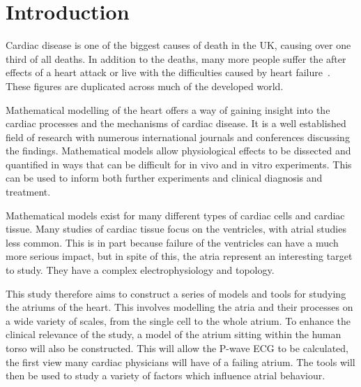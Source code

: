 \chapter{Introduction}

Cardiac disease is one of the biggest causes of death in the UK, causing over
one third of all deaths.
In addition to the deaths, many more people suffer the after effects of a heart
attack or live with the difficulties caused by heart failure~\cite{bhf2008}.
These figures are duplicated across much of the developed world.

Mathematical modelling of the heart offers a way of gaining insight into the
cardiac processes and the mechanisms of cardiac disease.
It is a well established field of research with numerous international journals
and conferences discussing the findings.
Mathematical models allow physiological effects to be dissected and quantified
in ways that can be difficult for in vivo and in vitro experiments.
This can be used to inform both further experiments and clinical diagnosis and
treatment.

Mathematical models exist for many different types of cardiac cells and
cardiac tissue.
Many studies of cardiac tissue focus on the ventricles, with atrial studies less
common.
This is in part because failure of the ventricles can have a much more serious
impact, but in spite of this, the atria represent an interesting target to
study.
They have a complex electrophysiology and topology.

This study therefore aims to construct a series of models and tools for studying
the atriums of the heart.
This involves modelling the atria and their processes on a wide variety of scales,
from the single cell to the whole atrium.
To enhance the clinical relevance of the study, a model of the atrium sitting
within the human torso will also be constructed.
This will allow the P-wave ECG to be calculated, the first view many cardiac
physicians will have of a failing atrium.
The tools will then be used to study a variety of factors which influence atrial
behaviour.







